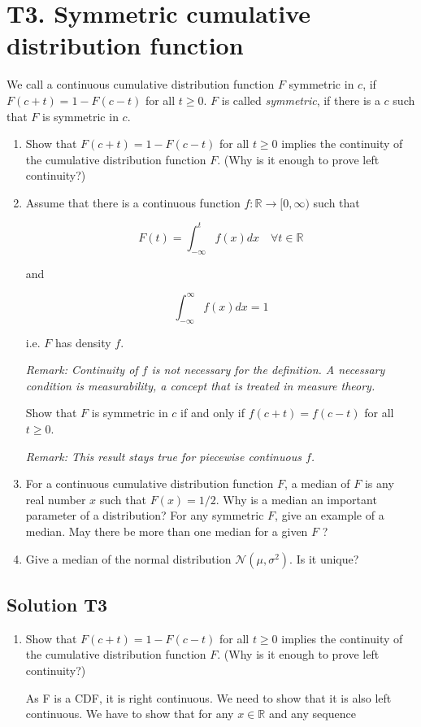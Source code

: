 \documentclass[12pt]{article}
\begin{document}
  


\section*{T3. Symmetric cumulative distribution function}
 We call a continuous cumulative distribution function $F$ symmetric in $c$, if $F(c+t)=1-F(c-t)$ for all $t \geq 0 $. $F$ is called \textit{symmetric}, if there is a $c$ such that $F$ is symmetric in $c$.

 \begin{enumerate}
    
 

    \item  Show that $F(c+t)=1-F(c-t)$ for all $t \geq 0$ implies the continuity of the cumulative distribution function $F$. (Why is it enough to prove left continuity?)

    \item  Assume that there is a continuous function $f: \mathbb{R} \rightarrow[0, \infty)$ such that

$$
F(t)=\int_{-\infty}^{t} f(x) d x \quad \forall t \in \mathbb{R}
$$

and

$$
\int_{-\infty}^{\infty} f(x) d x=1
$$

i.e. $F$ has density $f$.

\textit{Remark: Continuity of $f$ is not necessary for the definition. A necessary condition is measurability, a concept that is treated in measure theory.}

Show that $F$ is symmetric in $c$ if and only if $f(c+t)=f(c-t)$ for all $t \geq 0$.

\textit{Remark: This result stays true for piecewise continuous $f$.}

\item  For a continuous cumulative distribution function $F$, a median of $F$ is any real number $x$ such that $F(x)=1 / 2$. Why is a median an important parameter of a distribution? For any symmetric $F$, give an example of a median. May there be more than one median for a given $F$ ?

\item  Give a median of the normal distribution $\mathcal{N}\left(\mu, \sigma^{2}\right)$. Is it unique?
\end{enumerate}
\subsection*{Solution T3}
  
\begin{enumerate}
    \item Show that $F(c+t)=1-F(c-t)$ for all $t \geq 0$ implies the continuity of the cumulative distribution function $F$. (Why is it enough to prove left continuity?)
    
As F is a CDF, it is right continuous. We need to show that it is also left continuous.
We have to show that for any $x \in \mathbb{R}$ and any sequence



\end{enumerate}
\end{document}
